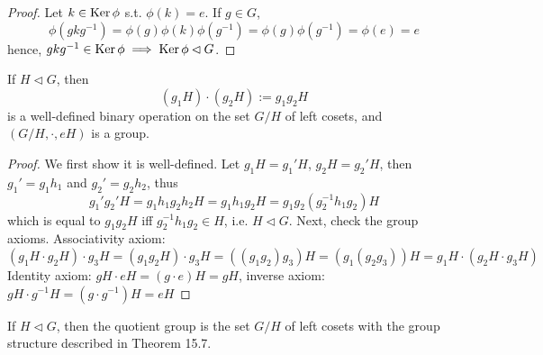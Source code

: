 \documentclass[a4paper]{article}
\begin{document}
\begin{proof}
Let $k\in\operatorname{Ker}\phi$ s.t. $\phi(k)=e$. If $g\in G$,
$$\phi(gkg^{-1})=\phi(g)\phi(k)\phi(g^{-1})=\phi(g)\phi(g^{-1})=\phi(e)=e$$
hence, $gkg^{-1}\in\operatorname{Ker}\phi\implies\operatorname{Ker}\phi\lhd G$.
\end{proof}
\begin{thm}
If $H\lhd G$, then
$$(g_1H)\cdot(g_2H):=g_1g_2H$$
is a well-defined binary operation on the set $G/H$ of left cosets, and $(G/H,\cdot,eH)$ is a group.
\end{thm}
\begin{proof}
We first show it is well-defined. Let $g_1H=g_1'H$, $g_2H=g_2'H$, then $g_1'=g_1h_1$ and $g_2'=g_2h_2$, thus
$$g_1'g_2'H=g_1h_1g_2h_2H=g_1h_1g_2H=g_1g_2(g_2^{-1}h_1g_2)H$$
which is equal to $g_1g_2H$ iff $g_2^{-1}h_1g_2\in H$, i.e. $H\lhd G$. Next, check the group axioms. Associativity axiom:
$$(g_1H\cdot g_2H)\cdot g_3H=(g_1g_2H)\cdot g_3H=((g_1g_2)g_3)H=(g_1(g_2g_3))H=g_1H\cdot(g_2H\cdot g_3H)$$
Identity axiom: $gH\cdot eH=(g\cdot e)H=gH$, inverse axiom: $gH\cdot g^{-1}H=(g\cdot g^{-1})H=eH$
\end{proof}
\begin{defi}
If $H\lhd G$, then the quotient group is the set $G/H$ of left cosets with the group structure described in Theorem 15.7.
\end{defi}
\newpage
\end{document}
